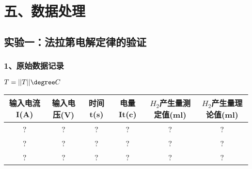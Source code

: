 \section*{五、数据处理}
        \subsection*{实验一：法拉第电解定律的验证}
    \subsubsection*{1、原始数据记录}
    \indent $T=||T||\degree C$\\
    \begin{tabular}{|c|c|c|c|c|c|}
        \hline
        输入电流 I(A) & 输入电压(V) & 时间t(s) & 电量It(c) & ${H}_{2}$产生量测定值(ml) & ${H}_{2}$产生量理论值(ml)\\
        \hline
        ? & ? & ? & ? & ? & ?\\
        \hline
        ? & ? & ? & ? & ? & ?\\
        \hline
        ? & ? & ? & ? & ? & ?\\
        \hline
    \end{tabular}

